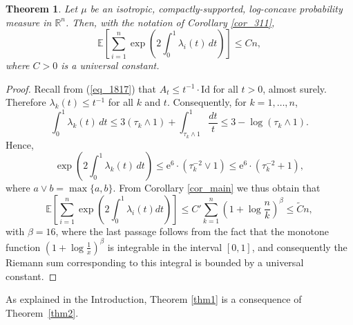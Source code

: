 \documentclass[12pt,a4paper]{article}
\newcommand{\E}{\mathbb{E}}
\newcommand{\prob}{\mathbb{P}}
\newcommand{\e}{\mathrm{e}}
\newcommand{\RR}{\mathbb{R}}
\newcommand{\id}{\mathrm{Id}}
\renewcommand{\tilde}{\widetilde}
\newtheorem{theorem}{Theorem}[section]
\theoremstyle{definition}
\begin{document}
\begin{theorem}\label{thm_guantype} 
Let $\mu$ be an isotropic, compactly-supported, log-concave probability measure in $\RR^n$. Then,
with the notation of Corollary \ref{cor_311},
\[
\E \left[
\sum_{i=1}^n \exp \left( 2 \int_0^1 \lambda_{i} (t) \, dt \right) \right]
\leq C n,
\]
where $C > 0$ is a universal constant.
\end{theorem}

\begin{proof}
Recall from (\ref{eq_1817}) that $A_t \leq t^{-1} \cdot \id$ for all $t > 0$, almost surely. Therefore $\lambda_{k}(t) \leq t^{-1}$ for
all $k$ and  $t$. Consequently, for $k=1,\ldots,n$, 
\[
\int_0^{1} \lambda_{k} (t) \, dt \leq 3 (\tau_k\wedge 1) + \int_{\tau_k \wedge 1}^1 \frac{dt}{t}
\leq 3 - \log ( \tau_k \wedge 1) .
\]
Hence,
\[
\exp \left( 2\int_0^{1} \lambda_{k}(t) \, dt \right) \leq \e^6 \cdot \left( \tau_k^{-2} \vee 1 \right)
\leq \e^6 \cdot \left( \tau_k^{-2} + 1 \right),
\]
where $a \vee b = \max \{a,b\}$. From Corollary \ref{cor_main} we thus obtain that 
\[
\E \left[ \sum_{i=1}^n \exp \left( 2 \int_0^1 \lambda_{i}(t) dt \right) \right]  \leq C' \sum_{k=1}^n \left(  1 + \log \frac nk \right)^\beta \leq \tilde{C} n,
\]
with $\beta = 16$, where the last passage follows from the fact that the monotone function $\left( 1+ \log \frac 1x \right)^\beta$ is integrable in the interval $[0,1]$, and consequently the Riemann sum
corresponding to this integral is bounded by a universal constant.
\end{proof}




As explained in the Introduction, Theorem \ref{thm1} 
is a consequence of Theorem~\ref{thm2}. 
\end{document}
